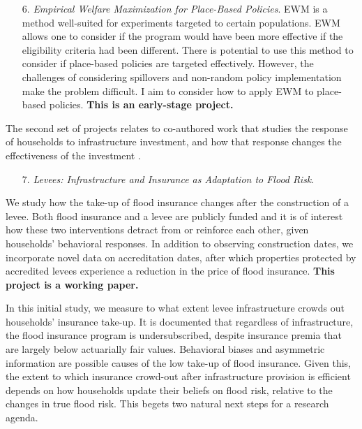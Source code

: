 \begin{enumerate}
\item[6.] \textit{Empirical Welfare Maximization for Place-Based Policies}. EWM \citep{kitagawa_who_2018} is a method well-suited for experiments targeted to certain populations. EWM allows one to consider if the program would have been more effective if the eligibility criteria had been different. There is potential to use this method to consider if place-based policies are targeted effectively. However, the challenges of considering spillovers and non-random policy implementation make the problem difficult. I aim to consider how to apply EWM to place-based policies. \textbf{This is an early-stage project.}
\end{enumerate}

The second set of projects relates to co-authored work that studies the response of households to infrastructure investment, and how that response changes the effectiveness of the investment \citep{vinnakota_levees_2023}. 


\begin{enumerate}
\item[7.] \textit{Levees: Infrastructure and Insurance as Adaptation to Flood Risk}.
\end{enumerate}

We study how the take-up of flood insurance changes after the construction of a levee. Both flood insurance and a levee are publicly funded and it is of interest how these two interventions detract from or reinforce each other, given households’ behavioral responses. In addition to observing construction dates, we incorporate novel data on accreditation dates, after which properties protected by accredited levees experience a reduction in the price of flood insurance. \textbf{This project is a working paper.}

In this initial study, we measure to what extent levee infrastructure crowds out households’ insurance take-up. It is documented that regardless of infrastructure, the flood insurance program is undersubscribed, despite insurance premia that are largely below actuarially fair values. Behavioral biases and asymmetric information are possible causes of the low take-up of flood insurance. Given this, the extent to which insurance crowd-out after infrastructure provision is efficient depends on how households update their beliefs on flood risk, relative to the changes in true flood risk. This begets two natural next steps for a research agenda.

